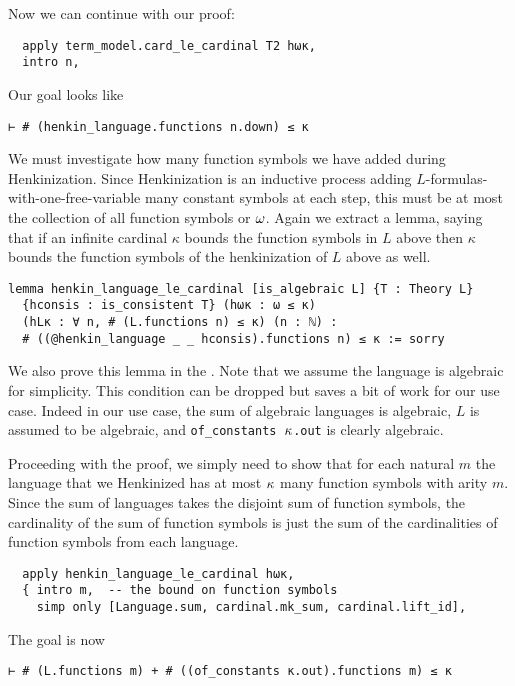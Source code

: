 Now we can continue with our proof:

\begin{lstlisting}
  apply term_model.card_le_cardinal T2 hωκ,
  intro n, \end{lstlisting}

Our goal looks like
\begin{lstlisting}
⊢ # (henkin_language.functions n.down) ≤ κ \end{lstlisting}

We must investigate how many function symbols we have added
during Henkinization.
Since Henkinization is an inductive process adding
$L$-formulas-with-one-free-variable many constant symbols at
each step, this must be at most the collection of all function symbols
or $\omega$.
Again we extract a lemma,
saying that if an infinite cardinal $\kappa$ bounds the
function symbols in $L$ above then
$\kappa$ bounds the function symbols of the henkinization of $L$
above as well.

\begin{lstlisting}
lemma henkin_language_le_cardinal [is_algebraic L] {T : Theory L}
  {hconsis : is_consistent T} (hωκ : ω ≤ κ)
  (hLκ : ∀ n, # (L.functions n) ≤ κ) (n : ℕ) :
  # ((@henkin_language _ _ hconsis).functions n) ≤ κ := sorry \end{lstlisting}

We also prove this lemma in the .
Note that we assume the language is algebraic for simplicity.
This condition can be dropped but saves a bit of work for our use case.
Indeed in our use case, the sum of algebraic languages is algebraic,
$L$ is assumed to be algebraic, and \texttt{of\_constants $\kappa$.out}
is clearly algebraic.

Proceeding with the proof, we simply need to show that
for each natural $m$
the language that we Henkinized has at most $\kappa$ many function symbols
with arity $m$.
Since the sum of languages takes the disjoint sum of function symbols,
the cardinality of the sum of function symbols is just the sum of
the cardinalities of function symbols from each language.

\begin{lstlisting}
  apply henkin_language_le_cardinal hωκ,
  { intro m,  -- the bound on function symbols
    simp only [Language.sum, cardinal.mk_sum, cardinal.lift_id], \end{lstlisting}

The goal is now

\begin{lstlisting}
⊢ # (L.functions m) + # ((of_constants κ.out).functions m) ≤ κ \end{lstlisting}

